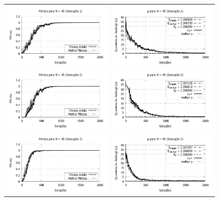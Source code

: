 	\begin{figure}[phtb]
	\centering
  \begin{tabular}{@{}cc@{}}
		\includegraphics[width=.40\textwidth]{figs/resultados/fitnessEL/N-40_E-1_fitness-extendido.pdf} &
    \includegraphics[width=.40\textwidth]{figs/resultados/fitnessEL/N-40_E-1_rho_extendido.pdf}   \\
		\includegraphics[width=.40\textwidth]{figs/resultados/fitnessEL/N-40_E-2_fitness-extendido.pdf} &
    \includegraphics[width=.40\textwidth]{figs/resultados/fitnessEL/N-40_E-2_rho_extendido.pdf}   \\
		\includegraphics[width=.40\textwidth]{figs/resultados/fitnessEL/N-40_E-3_fitness-extendido.pdf} &
    \includegraphics[width=.40\textwidth]{figs/resultados/fitnessEL/N-40_E-3_rho_extendido.pdf}   \\

\end{tabular}
\end{figure}
